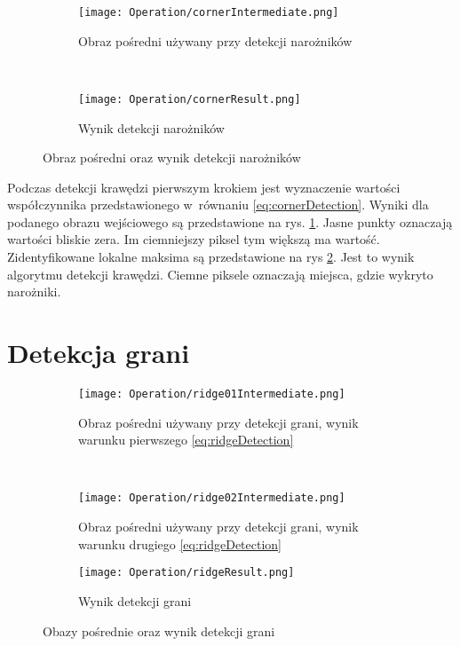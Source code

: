 \begin{figure}[h]
\begin{center}

\begin{subfigure}[t]{0.3\textwidth}
\texttt{[image: Operation/cornerIntermediate.png]}
\caption{Obraz pośredni używany przy detekcji narożników}
\label{fig:cornerIntermediate}
\end{subfigure}
~
\begin{subfigure}[t]{0.3\textwidth}
\texttt{[image: Operation/cornerResult.png]}
\caption{Wynik detekcji narożników}
\label{fig:cornerResult}
\end{subfigure}

\end{center}
\label{fig:showEdge}
\caption{Obraz pośredni oraz wynik detekcji narożników}
\end{figure}

Podczas detekcji krawędzi pierwszym krokiem jest wyznaczenie wartości współczynnika przedstawionego w~równaniu \eqref{eq:cornerDetection}. Wyniki dla podanego obrazu wejściowego są przedstawione na rys. \ref{fig:cornerIntermediate}. Jasne punkty oznaczają wartości bliskie zera. Im ciemniejszy piksel tym większą ma wartość. Zidentyfikowane lokalne maksima są przedstawione na rys \ref{fig:cornerResult}. Jest to wynik algorytmu detekcji krawędzi. Ciemne piksele oznaczają miejsca, gdzie wykryto narożniki.

\section{Detekcja grani}
\label{sec:dzialanieRidge}

\begin{figure}[h]
\begin{center}

\begin{subfigure}[t]{0.3\textwidth}
\texttt{[image: Operation/ridge01Intermediate.png]}
\caption{Obraz pośredni używany przy detekcji grani, wynik warunku pierwszego \eqref{eq:ridgeDetection}}
\label{fig:ridgeIntermediate1}
\end{subfigure}
~
\begin{subfigure}[t]{0.3\textwidth}
\texttt{[image: Operation/ridge02Intermediate.png]}
\caption{Obraz pośredni używany przy detekcji grani, wynik warunku drugiego \eqref{eq:ridgeDetection}}
\label{fig:ridgeIntermediate2}
\end{subfigure}

\begin{subfigure}[t]{0.3\textwidth}
\texttt{[image: Operation/ridgeResult.png]}
\caption{Wynik detekcji grani}
\label{fig:ridgeResult}
\end{subfigure}

\end{center}
\label{fig:showEdge}
\caption{Obazy pośrednie oraz wynik detekcji grani}
\end{figure}

